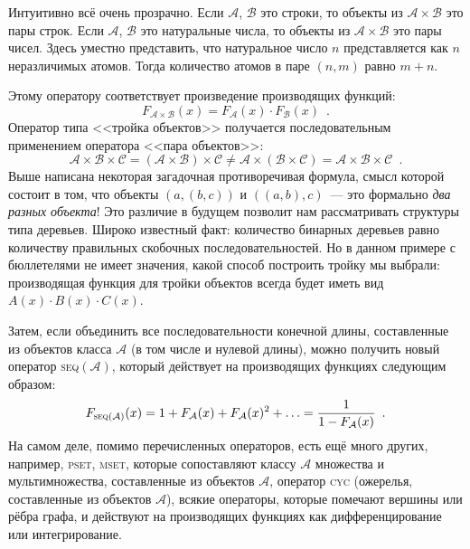 \documentclass[a5paper]{article}
\theoremstyle{definition}
\begin{document}
Интуитивно всё очень прозрачно. Если \( \mathcal A \), \( \mathcal B \) это 
строки, то объекты из \( \mathcal A \times \mathcal B \) это пары строк. Если 
\( \mathcal A \), \( \mathcal B \) это натуральные числа, то объекты из \( 
\mathcal A \times \mathcal B \) это пары чисел. Здесь уместно представить, что 
натуральное число \( n \) представляется как \( n \) неразличимых атомов. Тогда 
количество атомов в паре \( (n, m) \) равно \( m + n \).

Этому оператору 
соответствует произведение 
производящих функций:
\[
	F_{\mathcal A \times \mathcal B}(x) = F_{\mathcal A}(x) \cdot F_{\mathcal 
	B}(x) \enspace.
\]
Оператор типа <<тройка объектов>> получается последовательным применением 
оператора <<пара объектов>>:
\[
	\mathcal A \times \mathcal B \times \mathcal C = (\mathcal A \times 
	\mathcal B) \times \mathcal C \neq \mathcal A \times (\mathcal B \times 
	\mathcal C) = \mathcal A 
	\times \mathcal B \times \mathcal C
	\enspace .
\]
Выше написана некоторая загадочная противоречивая формула, смысл которой 
состоит в том, что объекты \( (a, (b, c)) \) и \( ((a, b), c) \)~--- это 
формально \textit{два разных объекта}! Это различие в будущем позволит нам 
рассматривать структуры типа деревьев. Широко известный факт: количество 
бинарных деревьев равно количеству правильных скобочных последовательностей. Но 
в данном примере с бюллетелями не имеет значения, какой способ построить тройку 
мы выбрали: производящая функция для тройки объектов всегда будет иметь вид \( 
A(x) \cdot B(x) \cdot C(x) \).

Затем, если объединить все последовательности конечной длины, составленные из 
объектов класса \( \mathcal A \) (в том числе и 
нулевой длины), можно получить новый оператор \textsc{seq}\( (\mathcal A) \), 
который действует 
на производящих функциях следующим образом:
\[
	F_{\text{\textsc{seq}}(\mathcal A)} (x) = 1 + F_{\mathcal A}(x) + 
	F_{\mathcal A}(x)^2 + \ldots = 
	\dfrac{1}{1 - F_{\mathcal A}(x)} \enspace .
\]
На самом деле, помимо перечисленных операторов, есть ещё много других, 
например, \textsc{pset}, \textsc{mset}, которые сопоставляют классу \( \mathcal 
A \) множества и 
мультимножества, составленные из объектов \( \mathcal A \), оператор 
\textsc{cyc} (ожерелья, составленные из объектов \( \mathcal A \)), всякие 
операторы, которые 
помечают вершины или рёбра графа, и действуют на производящих функциях как 
дифференцирование или интегрирование.
\end{document}
